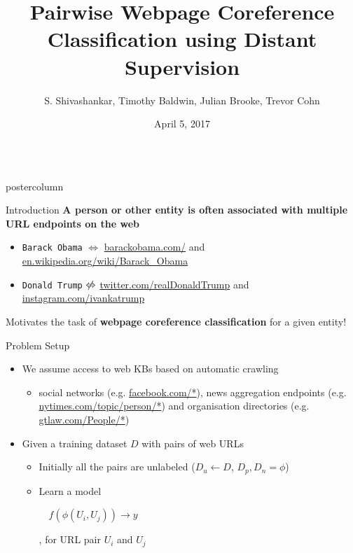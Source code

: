 \documentclass{beamer}
\title{\huge Pairwise Webpage Coreference Classification using Distant Supervision}
\author{S. Shivashankar, Timothy Baldwin, Julian Brooke, Trevor Cohn}
\institute[The University of Melbourne]{Computing and Information Systems, The University of Melbourne, Australia}
\date{April 5, 2017}
\newlength{\columnheight}
\begin{document}
\begin{frame}
\begin{columns}
	\begin{column}{.5\textwidth}
		\begin{beamercolorbox}[center]{postercolumn}
			\begin{minipage}{.98\textwidth}  %
				\parbox[t][\columnheight]{\textwidth}{ %
					\begin{myblock}{Introduction}
						\textbf{A person or other entity is often associated with multiple URL endpoints on the web}
						\vspace{0.5em}
			               \begin{itemize}
			                \item { \color{gray} \tt Barack Obama} $\Leftrightarrow$ {\color{blue} \small \url{barackobama.com/}} and {\color{blue} \small \url{en.wikipedia.org/wiki/Barack_Obama}}
					\item { \color{gray} \tt Donald Trump} $\centernot\Leftrightarrow$ {\color{blue} \small \url{twitter.com/realDonaldTrump}} and {\color{blue}  \small \url{instagram.com/ivankatrump}}
			                \end{itemize}
	              {\color{brown} Motivates the task of  \textbf{webpage coreference classification} for a given entity!}
    				\end{myblock}\vfill
					\begin{myblock}{Problem Setup}
						\vspace{0.5em}
	 \begin{itemize}
	\item We assume access to web KBs based on automatic crawling
	\begin{itemize}
	 \item social networks (e.g. {\color{blue} \url{facebook.com/*})}, news aggregation endpoints (e.g. {\color{blue} \url{nytimes.com/topic/person/*}}) and organisation directories (e.g.  {\color{blue} \url{gtlaw.com/People/*}})
	\end{itemize}     	
\item  Given a training dataset $D$ with pairs of web URLs 
         \begin{itemize}
\item Initially all the pairs are unlabeled ($D_{u} \leftarrow D$, $D_{p}, D_{n} = \phi$)
\item Learn a model \begin{small} $\quad f(\phi(U_{i}, U_{j})) \to y$ \end{small}, for URL pair $U_{i}$ and $U_{j}$

\end{itemize}
\end{itemize}
\end{myblock}}
\end{minipage}
\end{beamercolorbox}
\end{column}
\end{columns}
\end{frame}
\end{document}
